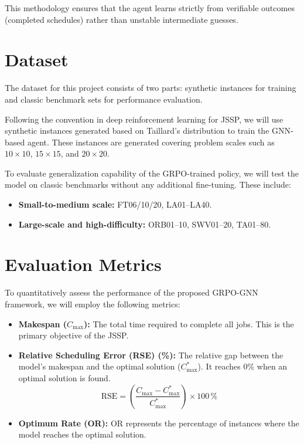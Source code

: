 \documentclass{article}
\begin{document}
This methodology ensures that the agent learns strictly from verifiable outcomes (completed schedules) rather than unstable intermediate guesses.

\section{Dataset}
\label{dataset}

The dataset for this project consists of two parts: 
synthetic instances for training and classic benchmark sets for performance evaluation.

Following the convention in deep reinforcement learning for JSSP, 
we will use synthetic instances generated based on Taillard's distribution to train the GNN-based agent. 
These instances are generated covering problem scales such as $10 \times 10$, $15 \times 15$, and $20 \times 20$.

To evaluate generalization capability of the GRPO-trained policy, 
we will test the model on classic benchmarks without any additional fine-tuning. These include:

\begin{itemize}
  \item \textbf{Small-to-medium scale:} FT06/10/20, LA01--LA40.
  \item \textbf{Large-scale and high-difficulty:} ORB01--10, SWV01--20, TA01--80.
\end{itemize}


\section{Evaluation Metrics}
\label{metrics}

To quantitatively assess the performance of the proposed GRPO-GNN framework, we will employ the following metrics:

\begin{itemize}
  \item \textbf{Makespan ($C_{\max}$):} The total time required to complete all jobs. This is the primary objective of the JSSP.

  \item \textbf{Relative Scheduling Error (RSE) (\%):}  The relative gap between the model's makespan and the optimal solution ($C^*_{\max}$). It reaches 0\% when an optimal solution is found.
  \[
    \mathrm{RSE} = \left( \frac{C_{\max} - C^*_{\max}}{C^*_{\max}} \right) \times 100\,\%
  \]

  \item \textbf{Optimum Rate (OR):}
  OR represents the percentage of instances where the model reaches the optimal solution.
\end{itemize}
\end{document}
